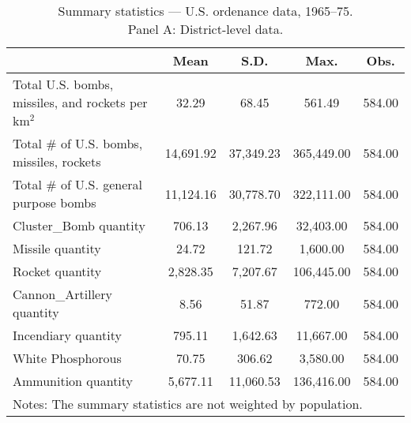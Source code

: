 \begin{table}[htbp]\centering
\def\sym#1{\ifmmode^{#1}\else\(^{#1}\)\fi}
\caption{Summary statistics — U.S. ordenance data, 1965–75. \\ Panel A: District-level data.}
\begin{tabular}{l*{1}{cccc}}
\toprule
                    &        Mean&        S.D.&        Max.&        Obs.\\
\midrule
Total U.S. bombs, missiles, and rockets per km$^2$&       32.29&       68.45&      561.49&      584.00\\
Total # of U.S. bombs, missiles, rockets&   14,691.92&   37,349.23&  365,449.00&      584.00\\
Total # of U.S. general purpose bombs&   11,124.16&   30,778.70&  322,111.00&      584.00\\
Cluster\_Bomb quantity&      706.13&    2,267.96&   32,403.00&      584.00\\
Missile quantity    &       24.72&      121.72&    1,600.00&      584.00\\
Rocket quantity     &    2,828.35&    7,207.67&  106,445.00&      584.00\\
Cannon\_Artillery quantity&        8.56&       51.87&      772.00&      584.00\\
Incendiary quantity &      795.11&    1,642.63&   11,667.00&      584.00\\
White Phosphorous   &       70.75&      306.62&    3,580.00&      584.00\\
Ammunition quantity &    5,677.11&   11,060.53&  136,416.00&      584.00\\
\bottomrule
\multicolumn{5}{l}{\footnotesize Notes: The summary statistics are not weighted by population.}\\
\end{tabular}
\end{table}
